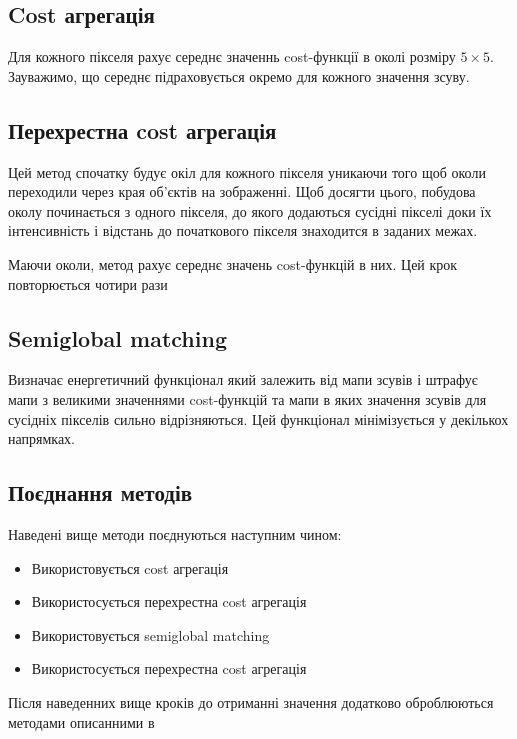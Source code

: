 \documentclass[11pt]{article}
\theoremstyle{definition}
\begin{document}
\subsection{Cost агрегація}
Для кожного пікселя рахує середнє значеннь cost-функції в околі розміру $5 \times 5$. Зауважимо, що середнє підраховується окремо для кожного значення зсуву.

\subsection{Перехрестна cost агрегація}
Цей метод спочатку будує окіл для кожного пікселя уникаючи того щоб околи переходили через края об'єктів на зображенні. Щоб досягти цього,  побудова околу починається з одного пікселя, до якого додаються сусідні пікселі доки їх інтенсивність і відстань до початкового пікселя знаходится в заданих межах.

Маючи околи, метод рахує середнє значень cost-функцій в них. Цей крок повторюється чотири рази

\subsection{Semiglobal matching}
Визначає енергетичний функціонал який залежить від мапи зсувів і штрафує мапи з великими значеннями cost-функцій та мапи в яких значення зсувів для сусідніх пікселів сильно відрізняються. Цей функціонал мінімізується у декількох напрямках.

\subsection{Поєднання методів}
Наведені вище методи поєднуються наступним чином:
\begin{itemize}
	\item Використовується cost агрегація
	\item Використосується перехрестна cost агрегація
	\item Використовується semiglobal matching
	\item Використосується перехрестна cost агрегація
\end{itemize}

Після наведенних вище кроків до отриманні значення додатково оброблюються методами описанними в \cite{zbontar2016stereo}
\end{document}

